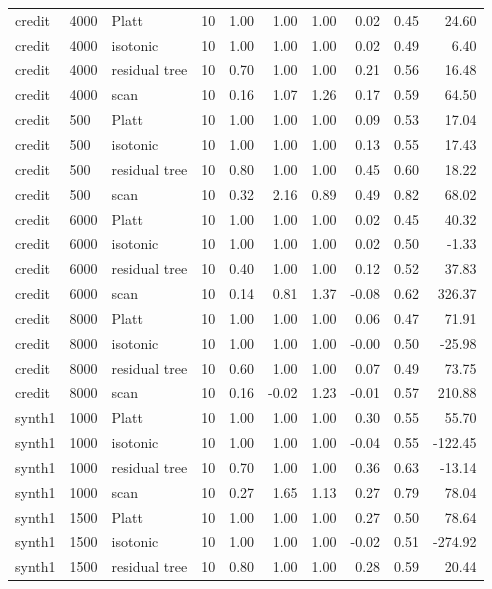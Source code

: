 \begin{tabular}{lllrrrrrrr}
credit & 4000 & Platt & 10 & 1.00 & 1.00 & 1.00 & 0.02 & 0.45 & 24.60 \\
credit & 4000 & isotonic & 10 & 1.00 & 1.00 & 1.00 & 0.02 & 0.49 & 6.40 \\
credit & 4000 & residual tree & 10 & 0.70 & 1.00 & 1.00 & 0.21 & 0.56 & 16.48 \\
credit & 4000 & scan & 10 & 0.16 & 1.07 & 1.26 & 0.17 & 0.59 & 64.50 \\
credit & 500 & Platt & 10 & 1.00 & 1.00 & 1.00 & 0.09 & 0.53 & 17.04 \\
credit & 500 & isotonic & 10 & 1.00 & 1.00 & 1.00 & 0.13 & 0.55 & 17.43 \\
credit & 500 & residual tree & 10 & 0.80 & 1.00 & 1.00 & 0.45 & 0.60 & 18.22 \\
credit & 500 & scan & 10 & 0.32 & 2.16 & 0.89 & 0.49 & 0.82 & 68.02 \\
credit & 6000 & Platt & 10 & 1.00 & 1.00 & 1.00 & 0.02 & 0.45 & 40.32 \\
credit & 6000 & isotonic & 10 & 1.00 & 1.00 & 1.00 & 0.02 & 0.50 & -1.33 \\
credit & 6000 & residual tree & 10 & 0.40 & 1.00 & 1.00 & 0.12 & 0.52 & 37.83 \\
credit & 6000 & scan & 10 & 0.14 & 0.81 & 1.37 & -0.08 & 0.62 & 326.37 \\
credit & 8000 & Platt & 10 & 1.00 & 1.00 & 1.00 & 0.06 & 0.47 & 71.91 \\
credit & 8000 & isotonic & 10 & 1.00 & 1.00 & 1.00 & -0.00 & 0.50 & -25.98 \\
credit & 8000 & residual tree & 10 & 0.60 & 1.00 & 1.00 & 0.07 & 0.49 & 73.75 \\
credit & 8000 & scan & 10 & 0.16 & -0.02 & 1.23 & -0.01 & 0.57 & 210.88 \\
synth1 & 1000 & Platt & 10 & 1.00 & 1.00 & 1.00 & 0.30 & 0.55 & 55.70 \\
synth1 & 1000 & isotonic & 10 & 1.00 & 1.00 & 1.00 & -0.04 & 0.55 & -122.45 \\
synth1 & 1000 & residual tree & 10 & 0.70 & 1.00 & 1.00 & 0.36 & 0.63 & -13.14 \\
synth1 & 1000 & scan & 10 & 0.27 & 1.65 & 1.13 & 0.27 & 0.79 & 78.04 \\
synth1 & 1500 & Platt & 10 & 1.00 & 1.00 & 1.00 & 0.27 & 0.50 & 78.64 \\
synth1 & 1500 & isotonic & 10 & 1.00 & 1.00 & 1.00 & -0.02 & 0.51 & -274.92 \\
synth1 & 1500 & residual tree & 10 & 0.80 & 1.00 & 1.00 & 0.28 & 0.59 & 20.44 \\

\end{tabular}
